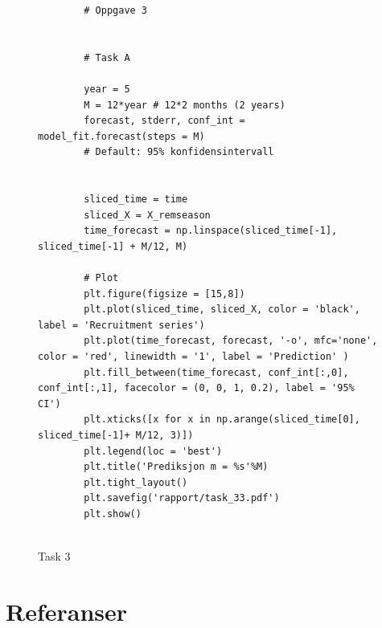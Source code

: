 \begin{figure}[hbt!]
    \begin{lstlisting}
        # Oppgave 3


        # Task A
        
        year = 5
        M = 12*year # 12*2 months (2 years)
        forecast, stderr, conf_int = model_fit.forecast(steps = M)
        # Default: 95% konfidensintervall
        
        
        sliced_time = time
        sliced_X = X_remseason
        time_forecast = np.linspace(sliced_time[-1], sliced_time[-1] + M/12, M)
        
        # Plot
        plt.figure(figsize = [15,8])
        plt.plot(sliced_time, sliced_X, color = 'black', label = 'Recruitment series')
        plt.plot(time_forecast, forecast, '-o', mfc='none', color = 'red', linewidth = '1', label = 'Prediction' )
        plt.fill_between(time_forecast, conf_int[:,0], conf_int[:,1], facecolor = (0, 0, 1, 0.2), label = '95% CI')
        plt.xticks([x for x in np.arange(sliced_time[0], sliced_time[-1]+ M/12, 3)])
        plt.legend(loc = 'best')
        plt.title('Prediksjon m = %s'%M)
        plt.tight_layout()
        plt.savefig('rapport/task_33.pdf')
        plt.show()
        
    \end{lstlisting}
\caption{Task 3}
\label{Kode5}
\end{figure}







\section{Referanser}
\begingroup
\renewcommand{\section}[2]{}%


\endgroup



 








